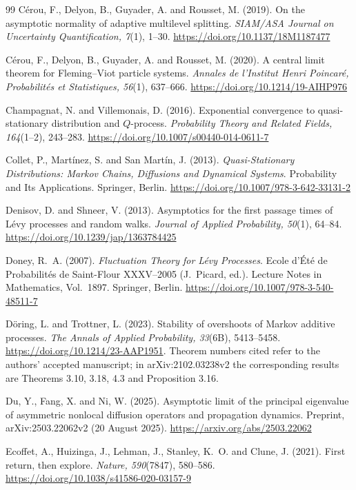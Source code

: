 \documentclass[11pt,a4paper]{article}
\theoremstyle{definition}
\theoremstyle{remark}
\newcommand{\1}{\mathbf 1}
\begin{document}
\begin{thebibliography}{99}
C\'erou, F., Delyon, B., Guyader, A. and Rousset, M. (2019). On the asymptotic normality of adaptive multilevel splitting. \emph{SIAM/ASA Journal on Uncertainty Quantification, 7}(1), 1--30. \url{https://doi.org/10.1137/18M1187477}

C\'erou, F., Delyon, B., Guyader, A. and Rousset, M. (2020). A central limit theorem for Fleming--Viot particle systems. \emph{Annales de l'Institut Henri Poincar\'e, Probabilit\'es et Statistiques, 56}(1), 637--666. \url{https://doi.org/10.1214/19-AIHP976}

Champagnat, N. and Villemonais, D. (2016). Exponential convergence to quasi-stationary distribution and $Q$-process. \emph{Probability Theory and Related Fields, 164}(1--2), 243--283. \url{https://doi.org/10.1007/s00440-014-0611-7}

Collet, P., Mart\'inez, S. and San Mart\'in, J. (2013). \emph{Quasi-Stationary Distributions: Markov Chains, Diffusions and Dynamical Systems}. Probability and Its Applications. Springer, Berlin. \url{https://doi.org/10.1007/978-3-642-33131-2}

Denisov, D. and Shneer, V. (2013). Asymptotics for the first passage times of L\'evy processes and random walks. \emph{Journal of Applied Probability, 50}(1), 64--84. \url{https://doi.org/10.1239/jap/1363784425}

Doney, R.~A. (2007). \emph{Fluctuation Theory for L\'evy Processes}. Ecole d'\'Et\'e de Probabilit\'es de Saint-Flour XXXV--2005 (J.~Picard, ed.). Lecture Notes in Mathematics, Vol.~1897. Springer, Berlin. \url{https://doi.org/10.1007/978-3-540-48511-7}

D\"oring, L. and Trottner, L. (2023). Stability of overshoots of Markov additive processes. \emph{The Annals of Applied Probability, 33}(6B), 5413--5458. \url{https://doi.org/10.1214/23-AAP1951}. Theorem numbers cited refer to the authors' accepted manuscript; in arXiv:2102.03238v2 the corresponding results are Theorems 3.10, 3.18, 4.3 and Proposition 3.16.

Du, Y., Fang, X. and Ni, W. (2025). Asymptotic limit of the principal eigenvalue of asymmetric nonlocal diffusion operators and propagation dynamics. Preprint, arXiv:2503.22062v2 (20 August 2025). \url{https://arxiv.org/abs/2503.22062}

Ecoffet, A., Huizinga, J., Lehman, J., Stanley, K.~O. and Clune, J. (2021). First return, then explore. \emph{Nature, 590}(7847), 580--586. \url{https://doi.org/10.1038/s41586-020-03157-9}


\end{thebibliography}
\end{document}
